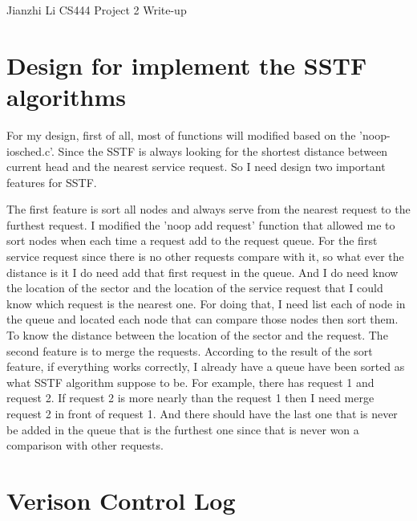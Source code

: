\documentclass[letterpaper,11pt,titlepage]{article}
\begin{document}
Jianzhi Li\newline
CS444 Project 2 Write-up

\section{Design for implement the SSTF algorithms}

For my design, first of all, most of functions will modified based on the 'noop-iosched.c'. Since the SSTF is always looking for the 
shortest distance between current head and the nearest service request. So I need design two important features for SSTF.

The first feature is sort all nodes and always serve from the nearest request to the furthest request. I modified the 'noop add request'
function that allowed me to sort nodes when each time a request add to the request queue. For the first service request since there is no other requests compare with
it, so what ever the distance is it I do need add that first request in the queue. And I do need know the location of the sector and the location of the service request that I could 
know which request is the nearest one. For doing that, I need list each of node in the queue and located each node that can compare those nodes then sort them.
To know the distance between the location of the sector and the request. The second feature is to merge the requests. According to the result of the sort feature, if everything works correctly,
I already have a queue have been sorted as what SSTF algorithm suppose to be. For example, there has request 1 and request 2. If request 2 is more nearly than the request 1 then I need
merge request 2 in front of request 1. And there should have the last one that is never be added in the queue that is the furthest one since that is never won a comparison with other requests.   



\section{Verison Control Log}
\end{document}
